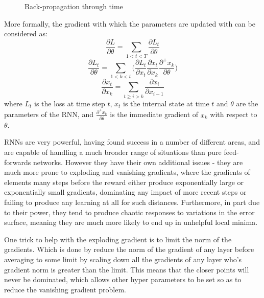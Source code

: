 \begin{figure}
\centering

\caption{Back-propagation through time}
\label{fig:bptt}
\end{figure}
More formally, the gradient with which the parameters are updated with can be considered as:
\begin{equation}
\frac{\partial L}{\partial \theta} = \sum_{1<t<T}\frac{\partial L_t}{\partial\theta}
\end{equation}
\begin{equation}
\frac{\partial L_t}{\partial\theta} = \sum_{1 < k< t} \big( \frac{\partial L_t}{\partial x_t}\frac{\partial x_t}{\partial x_k} \frac{\partial^+ x_k}{\partial\theta} \big)
\end{equation}
\begin{equation}
\frac{\partial x_t}{\partial x_k} =\sum_{t \geq i > k} \frac{\partial x_i}{\partial x_{i-1}} 
\end{equation}
 where $L_t$ is the loss at time step $t$, $x_t$ is the internal state at time $t$ and $\theta$ are the parameters of the RNN, and $\frac{\partial^+ x_k}{\partial\theta}$ is the immediate gradient of $x_k$ with respect to $\theta$. \cite{pascanu2012difficulty}
 
RNNs are very powerful, having found success in a number of different areas, and are capable of handling a much broader range of situations than pure feed-forwards networks. However they have their own additional issues - they are much more prone to exploding and vanishing gradients, where the gradients of elements many steps before the reward either produce exponentially large or exponentially small gradients, dominating any impact of more recent steps or failing to produce any learning at all for such distances. Furthermore, in part due to their power, they tend to produce chaotic responses to variations in the error surface, meaning they are much more likely to end up in unhelpful local minima.

One trick to help with the exploding gradient is to limit the norm of the gradients. Which is done by reduce the norm of the gradient of any layer before averaging to some limit by scaling down all the gradients of any layer who's gradient  norm is greater than the limit. This means that the closer points will never be dominated, which allows other hyper parameters to be set so as to reduce the vanishing gradient problem.

